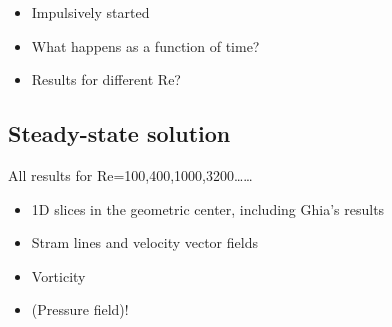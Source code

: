\documentclass[final,3p,twocolumn]{elsarticle}
\begin{document}
\begin{itemize}
    \item Impulsively started
    \item What happens as a function of time? 
    \item Results for different Re? 
\end{itemize}

\subsection{Steady-state solution}
\label{subsec:steady}

All results for Re=100,400,1000,3200\ldots\ldots

\begin{itemize}
    \item 1D slices in the geometric center, including Ghia's results
    \item Stram lines and velocity vector fields
    \item Vorticity 
    \item (Pressure field)!
\end{itemize}
\end{document}
